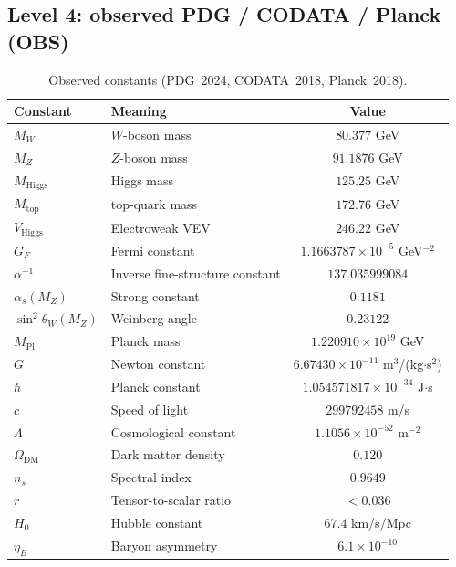 \documentclass[11pt,a4paper]{article}
\theoremstyle{definition}
\begin{document}
\subsection{Level 4: observed PDG / CODATA / Planck (OBS)}
\label{app:level-4-obs}

\begin{table}[ht]
\centering
\caption{Observed constants (PDG~2024, CODATA~2018, Planck~2018).}
\label{tab:app-obs}
\begin{tabular}{llc}
\toprule
Constant & Meaning & Value \\
\midrule
$M_W$ & $W$-boson mass & $80.377$ GeV \\
$M_Z$ & $Z$-boson mass & $91.1876$ GeV \\
$M_{\text{Higgs}}$ & Higgs mass & $125.25$ GeV \\
$M_{\text{top}}$ & top-quark mass & $172.76$ GeV \\
$V_{\text{Higgs}}$ & Electroweak VEV & $246.22$ GeV \\
$G_F$ & Fermi constant & $1.1663787 \times 10^{-5}$ GeV$^{-2}$ \\
$\alpha^{-1}$ & Inverse fine-structure constant & $137.035999084$ \\
$\alpha_s(M_Z)$ & Strong constant & $0.1181$ \\
$\sin^2\theta_W(M_Z)$ & Weinberg angle & $0.23122$ \\
$M_{\text{Pl}}$ & Planck mass & $1.220910 \times 10^{19}$ GeV \\
$G$ & Newton constant & $6.67430 \times 10^{-11}$ m$^3$/(kg$\cdot$s$^2$) \\
$\hbar$ & Planck constant & $1.054571817 \times 10^{-34}$ J$\cdot$s \\
$c$ & Speed of light & $299792458$ m/s \\
$\Lambda$ & Cosmological constant & $1.1056 \times 10^{-52}$ m$^{-2}$ \\
$\Omega_{\text{DM}}$ & Dark matter density & $0.120$ \\
$n_s$ & Spectral index & $0.9649$ \\
$r$ & Tensor-to-scalar ratio & $< 0.036$ \\
$H_0$ & Hubble constant & $67.4$ km/s/Mpc \\
$\eta_B$ & Baryon asymmetry & $6.1 \times 10^{-10}$ \\
\bottomrule
\end{tabular}
\end{table}
\end{document}
